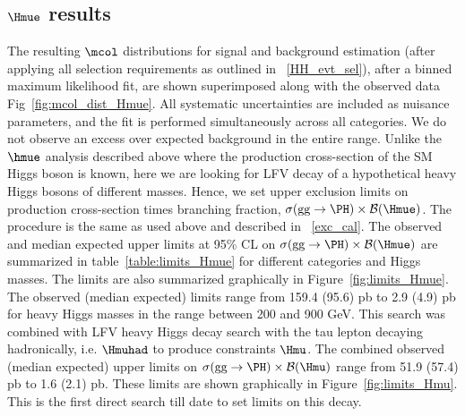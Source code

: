 \subsection{$\Hmue$ results}
The resulting $\mcol$ distributions for signal and background estimation (after applying all selection requirements as outlined in ~\ref{HH_evt_sel}), after a binned maximum likelihood fit, are shown superimposed along with the observed data Fig~\ref{fig:mcol_dist_Hmue}. All systematic uncertainties are included as nuisance parameters, and the fit is performed simultaneously across all categories. We do not observe an excess over expected background in the entire range. Unlike the $\hmue$ analysis described above where the production cross-section of the SM Higgs boson is known, here we are looking for LFV decay of a hypothetical heavy Higgs bosons of different masses. Hence, we set upper exclusion limits on production cross-section times branching fraction, $\sigma(\textrm{gg}\rightarrow \PH)\times\mathcal{B}(\Hmue)$. The procedure is the same as used above and described in ~\ref{exc_cal}. The observed and median expected upper limits at 95\% CL on $\sigma(\textrm{gg}\rightarrow \PH)\times\mathcal{B}(\Hmue)$ are summarized in table~\ref{table:limits_Hmue} for different categories and Higgs masses. The limits are also summarized graphically in Figure~\ref{fig:limits_Hmue}. The observed (median expected) limits range from 159.4 (95.6) pb to 2.9 (4.9) pb for heavy Higgs masses in the range between 200 and 900 GeV. This search was combined with LFV heavy Higgs decay search with the tau lepton decaying hadronically, i.e. $\Hmuhad$ to produce constraints $\Hmu$. The combined observed (median expected) upper limits on $\sigma(\textrm{gg}\rightarrow \PH)\times\mathcal{B}(\Hmu)$ range from 51.9 (57.4) pb to 1.6 (2.1) pb. These limits are shown graphically in Figure~\ref{fig:limits_Hmu}. This is the first direct search till date to set limits on this decay.      

